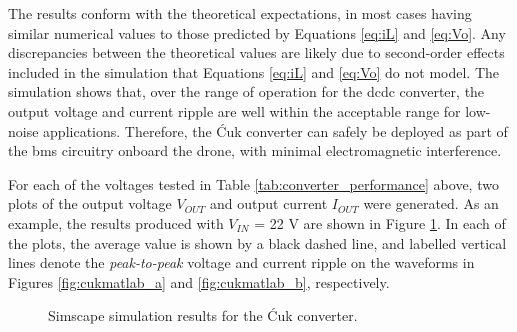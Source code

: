  The results conform with the theoretical expectations, in most cases having similar numerical values to those predicted by Equations \ref{eq:iL} and \ref{eq:Vo}. Any discrepancies between the theoretical values are likely due to second-order effects included in the simulation that Equations \ref{eq:iL} and \ref{eq:Vo} do not model. The simulation shows that, over the range of operation for the \acrshort{dcdc} converter, the output voltage and current ripple are well within the acceptable range for low-noise applications. Therefore, the Ćuk converter can safely be deployed as part of the \acrshort{bms} circuitry onboard the drone, with minimal electromagnetic interference.


For each of the voltages tested in Table \ref{tab:converter_performance} above, two plots of the output voltage $V_{OUT}$ and output current $I_{OUT}$ were generated. As an example, the results produced with $V_{IN}$ = 22 V are shown in Figure \ref{fig:cukmatlab}. In each of the plots, the average value is shown by a black dashed line, and labelled vertical lines denote the \textit{peak-to-peak} voltage and current ripple on the waveforms in Figures \ref{fig:cukmatlab_a} and \ref{fig:cukmatlab_b}, respectively. 

\begin{figure}[H]
\centering
{}

\vspace{0.1cm} %

\caption{Simscape simulation results for the Ćuk converter.}
\label{fig:cukmatlab}
\end{figure}


